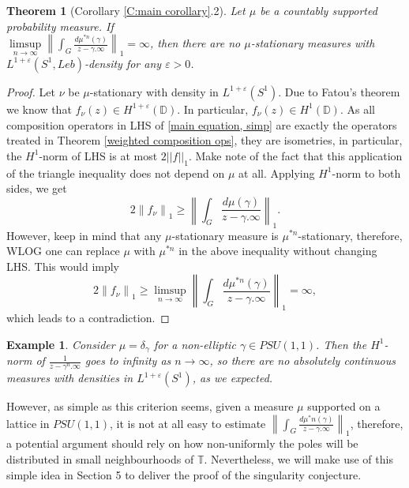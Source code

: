 \documentclass[11pt]{article}
\newtheorem{theorem}{Theorem}[section]
\newtheorem{example}{Example}[section]
\begin{document}
\begin{theorem}[Corollary \ref{C:main corollary}.2]
	Let $\mu$ be a countably supported probability measure. If \\ $\limsup\limits_{n \rightarrow \infty} \left\| \int_G \frac{d \mu^{*n}(\gamma)}{z - \gamma.\infty} \right\|_1 = \infty$, then there are no $\mu$-stationary measures with $L^{1+\varepsilon}(S^1, Leb)$-density for any $\varepsilon > 0$.
\end{theorem}
\begin{proof}
	Let $\nu$ be $\mu$-stationary with density in $L^{1+\varepsilon}(S^1)$. Due to Fatou's theorem we know that $f_\nu(z) \in H^{1 + \varepsilon}(\mathbb{D})$. In particular, $f_\nu(z) \in H^1(\mathbb{D})$. As all composition operators in LHS of \eqref{main equation, simp} are exactly the operators treated in Theorem \ref{weighted composition ops}, they are isometries, in particular, the $H^1$-norm of LHS is at most $2||f||_1$. Make note of the fact that this application of the triangle inequality does not depend on $\mu$ at all. Applying $H^1$-norm to both sides, we get
	\[
	2 \left\| f_\nu \right\|_1 \ge \left\| \int_G \frac{d \mu(\gamma)}{z - \gamma.\infty} \right\|_1.
	\]
	However, keep in mind that any $\mu$-stationary measure is $\mu^{*n}$-stationary, therefore, WLOG one can replace $\mu$ with $\mu^{*n}$ in the above inequality without changing LHS. This would imply
	\[
	2 \left\| f_\nu \right\|_1 \ge \limsup\limits_{n \rightarrow \infty} \left\| \int_G \frac{d \mu^{*n}(\gamma)}{z - \gamma.\infty} \right\|_1 = \infty,
	\]
	which leads to a contradiction.
\end{proof}

\begin{example}
	Consider $\mu = \delta_\gamma$ for a non-elliptic $\gamma \in PSU(1,1)$. Then the $H^1$-norm of $\frac{1}{z - \gamma^n.\infty}$ goes to infinity as $n \rightarrow \infty$, so there are no absolutely continuous measures with densities in $L^{1 + \varepsilon}(S^1)$, as we expected.
\end{example}

However, as simple as this criterion seems, given a measure $\mu$ supported on a lattice in $PSU(1,1)$, it is not at all easy to estimate $\left\| \int_G \frac{d \mu^*n(\gamma)}{z - \gamma.\infty} \right\|_1$, therefore, a potential argument should rely on how non-uniformly the poles will be distributed in small neighbourhoods of $\mathbb{T}$. Nevertheless, we will make use of this simple idea in Section 5 to deliver the proof of the singularity conjecture.
\end{document}
